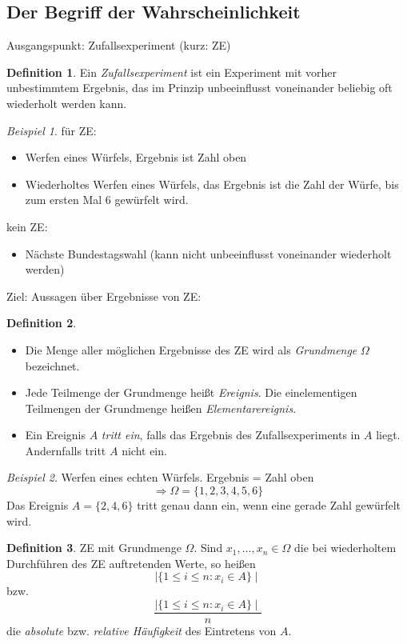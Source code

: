 \documentclass[a4paper,12pt,fleqn]{scrartcl}
\newcommand{\impl}{\Rightarrow}
\theoremstyle{definition}
\newtheorem*{definition}{Definition}
\theoremstyle{plain}
\theoremstyle{remark}
\newtheorem*{beispiel}{Beispiel}
\begin{document}
\subsection{Der Begriff der Wahrscheinlichkeit}
Ausgangspunkt: Zufallsexperiment (kurz: ZE)
\begin{definition}
Ein \emph{Zufallsexperiment} ist ein Experiment mit vorher unbestimmtem Ergebnis, das im Prinzip unbeeinflusst voneinander beliebig oft wiederholt werden kann.
\end{definition}
\begin{beispiel}
für ZE:
\begin{itemize}
\item Werfen eines Würfels, Ergebnis ist Zahl oben
\item Wiederholtes Werfen eines Würfels, das Ergebnis ist die Zahl der Würfe, bis zum ersten Mal $6$ gewürfelt wird.
\end{itemize}
kein ZE:
\begin{itemize}
\item Nächste Bundestagswahl (kann nicht unbeeinflusst voneinander wiederholt werden)
\end{itemize}
\end{beispiel}
Ziel: Aussagen über Ergebnisse von ZE:
\begin{definition}
\begin{itemize}
\item Die Menge aller möglichen Ergebnisse des ZE wird als \emph{Grundmenge} $\Omega$ bezeichnet.
\item Jede Teilmenge der Grundmenge heißt \emph{Ereignis}. Die einelementigen Teilmengen der Grundmenge heißen \emph{Elementarereignis}.
\item Ein Ereignis $A$ \emph{tritt ein}, falls das Ergebnis des Zufallsexperiments in $A$ liegt. Andernfalls tritt $A$ nicht ein.
\end{itemize}
\end{definition}
\begin{beispiel}
Werfen eines echten Würfels. Ergebnis = Zahl oben
\[\impl\Omega=\{ 1,2,3,4,5,6\}\]
Das Ereignis $A=\{ 2,4,6\}$ tritt genau dann ein, wenn eine gerade Zahl gewürfelt wird.
\end{beispiel}
\begin{definition}
ZE mit Grundmenge $\Omega$. Sind $x_1,\ldots,x_n\in\Omega$ die bei wiederholtem Durchführen des ZE auftretenden Werte, so heißen
\[\mid \{ 1\leq i\leq n:x_i\in A\}\mid\]
bzw.
\[\frac{\mid \{ 1\leq i\leq n:x_i\in A\}\mid}{n}\]
die \emph{absolute} bzw. \emph{relative Häufigkeit} des Eintretens von $A$.
\end{definition}
\end{document}
